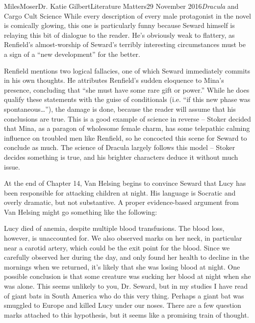 \documentclass[12pt,letterpaper]{article}
\renewenvironment{quote}
  {\list{}{\rightmargin=0.5in \leftmargin=0.5in}%
   \item\relax}
  {\endlist}
\begin{document}
\begin{mla}{Miles}{Moser}{Dr. Katie Gilbert}{Literature Matters}{29 November 2016}{\textit{Dracula} and Cargo Cult Science}
While every description of every male protagonist in the novel is comically glowing, this one is particularly funny because Seward himself is relaying this bit of dialogue to the reader. He’s obviously weak to flattery, as Renfield’s almost-worship of Seward’s terribly interesting circumstances must be a sign of a “new development” for the better.

Renfield mentions two logical fallacies, one of which Seward immediately commits in his own thoughts. He attributes Renfield’s sudden eloquence to Mina’s presence, concluding that “she must have some rare gift or power.” While he does qualify these statements with the guise of conditionals (i.e. “if this new phase was spontaneous…”), the damage is done, because the reader will assume that his conclusions are true. This is a good example of science in reverse – Stoker decided that Mina, as a paragon of wholesome female charm, has some telepathic calming influence on troubled men like Renfield, so he concocted this scene for Seward to conclude as much. The science of Dracula largely follows this model – Stoker decides something is true, and his brighter characters deduce it without much issue.

At the end of Chapter 14, Van Helsing begins to convince Seward that Lucy has been responsible for attacking children at night. His language is Socratic and overly dramatic, but not substantive. A proper evidence-based argument from Van Helsing might go something like the following:

\begin{quote}
Lucy died of anemia, despite multiple blood transfusions. The blood loss, however, is unaccounted for. We also observed marks on her neck, in particular near a carotid artery, which could be the exit point for the blood. Since we carefully observed her during the day, and only found her health to decline in the mornings when we returned, it’s likely that she was losing blood at night. One possible conclusion is that some creature was sucking her blood at night when she was alone. This seems unlikely to you, Dr. Seward, but in my studies I have read of giant bats in South America who do this very thing. Perhaps a giant bat was smuggled to Europe and killed Lucy under our noses. There are a few question marks attached to this hypothesis, but it seems like a promising train of thought.


\end{quote}
\end{mla}
\end{document}
